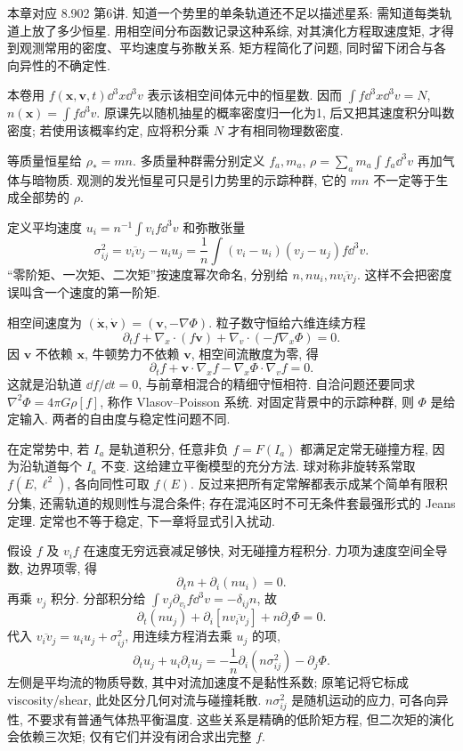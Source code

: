 
本章对应 8.902 第6讲. 知道一个势里的单条轨道还不足以描述星系: 需知道每类轨道上放了多少恒星. 用相空间分布函数记录这种系综, 对其演化方程取速度矩, 才得到观测常用的密度、平均速度与弥散关系. 矩方程简化了问题, 同时留下闭合与各向异性的不确定性.

本卷用 $f(\boldsymbol x,\boldsymbol v,t)\dd^3x\dd^3v$ 表示该相空间体元中的恒星数. 因而 $\int f\dd^3x\dd^3v=N$, $n(\boldsymbol x)=\int f\dd^3v$. 原课先以随机抽星的概率密度归一化为1, 后又把其速度积分叫数密度; 若使用该概率约定, 应将积分乘 $N$ 才有相同物理数密度.

等质量恒星给 $\rho_*=mn$. 多质量种群需分别定义 $f_a,m_a$, $\rho=\sum_am_a\int f_a\dd^3v$ 再加气体与暗物质. 观测的发光恒星可只是引力势里的示踪种群, 它的 $mn$ 不一定等于生成全部势的 $\rho$.

定义平均速度 $u_i=n^{-1}\int v_if\dd^3v$ 和弥散张量
\[
\sigma_{ij}^2=\overline{v_iv_j}-u_iu_j
=\frac1n\int(v_i-u_i)(v_j-u_j)f\dd^3v.
\]
“零阶矩、一次矩、二次矩”按速度幂次命名, 分别给 $n,nu_i,n\overline{v_iv_j}$. 这样不会把密度误叫含一个速度的第一阶矩.

相空间速度为 $(\dot{\boldsymbol x},\dot{\boldsymbol v})=(\boldsymbol v,-\nabla\Phi)$. 粒子数守恒给六维连续方程
\[
\partial_tf+\nabla_x\cdot(f\boldsymbol v)
+\nabla_v\cdot(-f\nabla_x\Phi)=0.
\]
因 $\boldsymbol v$ 不依赖 $\boldsymbol x$, 牛顿势力不依赖 $\boldsymbol v$, 相空间流散度为零, 得
\begin{equation}\label{eq:cbe}
\partial_tf+\boldsymbol v\cdot\nabla_xf
-\nabla_x\Phi\cdot\nabla_vf=0.
\end{equation}
这就是沿轨道 $\dd f/\dd t=0$, 与前章相混合的精细守恒相符. 自洽问题还要同求 $\nabla^2\Phi=4\pi G\rho[f]$, 称作 Vlasov--Poisson 系统. 对固定背景中的示踪种群, 则 $\Phi$ 是给定输入. 两者的自由度与稳定性问题不同.

在定常势中, 若 $I_a$ 是轨道积分, 任意非负 $f=F(I_a)$ 都满足定常无碰撞方程, 因为沿轨道每个 $I_a$ 不变. 这给建立平衡模型的充分方法. 球对称非旋转系常取 $f(E,\ell^2)$, 各向同性可取 $f(E)$. 反过来把所有定常解都表示成某个简单有限积分集, 还需轨道的规则性与混合条件; 存在混沌区时不可无条件套最强形式的 Jeans 定理. 定常也不等于稳定, 下一章将显式引入扰动.

假设 $f$ 及 $v_if$ 在速度无穷远衰减足够快, 对无碰撞方程积分. 力项为速度空间全导数, 边界项零, 得
\[
\partial_tn+\partial_i(nu_i)=0.
\]
再乘 $v_j$ 积分. 分部积分给 $\int v_j\partial_{v_i}f\dd^3v=-\delta_{ij}n$, 故
\[
\partial_t(nu_j)+\partial_i[n\overline{v_iv_j}]+n\partial_j\Phi=0.
\]
代入 $\overline{v_iv_j}=u_iu_j+\sigma_{ij}^2$, 用连续方程消去乘 $u_j$ 的项,
\[
\partial_tu_j+u_i\partial_iu_j
=-\frac1n\partial_i(n\sigma_{ij}^2)-\partial_j\Phi.
\]
左侧是平均流的物质导数, 其中对流加速度不是黏性系数; 原笔记将它标成 viscosity/shear, 此处区分几何对流与碰撞耗散. $n\sigma_{ij}^2$ 是随机运动的应力, 可各向异性, 不要求有普通气体热平衡温度. 这些关系是精确的低阶矩方程, 但二次矩的演化会依赖三次矩; 仅有它们并没有闭合求出完整 $f$.

